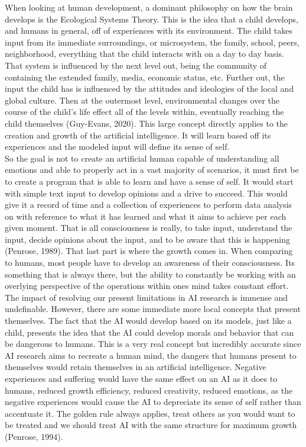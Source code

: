 \documentclass[11pt]{article}
\theoremstyle{plain}
\begin{document}
When looking at human development, a dominant philosophy on how the brain develops is the Ecological Systems Theory. This is the idea that a child develops, and humans in general, off of experiences with its environment. The child takes input from its immediate surroundings, or microsystem, the family, school, peers, neighborhood, everything that the child interacts with on a day to day basis. That system is influenced by the next level out, being the community of containing the extended family, media, economic status, etc. Further out, the input the child has is influenced by the attitudes and ideologies of the local and global culture. Then at the outermost level, environmental changes over the course of the child's life effect all of the levels within, eventually reaching the child themselves (Guy-Evans, 2020). This large concept directly applies to the creation and growth of the artificial intelligence. It will learn based off its experiences and the modeled input will define its sense of self. \\

So the goal is not to create an artificial human capable of understanding all emotions and able to properly act in a vast majority of scenarios, it must first be to create a program that is able to learn and have a sense of self. It would start with simple text input to develop opinions and a drive to succeed. This would give it a record of time and a collection of experiences to perform data analysis on with reference to what it has learned and what it aims to achieve per each given moment. That is all consciousness is really, to take input, understand the input, decide opinions about the input, and to be aware that this is happening (Penrose, 1989). That last part is where the growth comes in. When comparing to humans, most people have to develop an awareness of their consciousness. Its something that is always there, but the ability to constantly be working with an overlying perspective of the operations within ones mind takes constant effort. \\

The impact of resolving our present limitations in AI research is immense and undefinable. However, there are some immediate more local concepts that present themselves. The fact that the AI would develop based on its models, just like a child, presents the idea that the AI could develop morals and behavior that can be dangerous to humans. This is a very real concept but incredibly accurate since AI research aims to recreate a human mind, the dangers that humans present to themselves would retain themselves in an artificial intelligence. Negative experiences and suffering would have the same effect on an AI as it does to humans, reduced growth efficiency, reduced creativity, reduced emotions, as the negative experiences would cause the AI to depreciate its sense of self rather than accentuate it. The golden rule always applies, treat others as you would want to be treated and we should treat AI with the same structure for maximum growth (Penrose, 1994).\\ 
\end{document}
